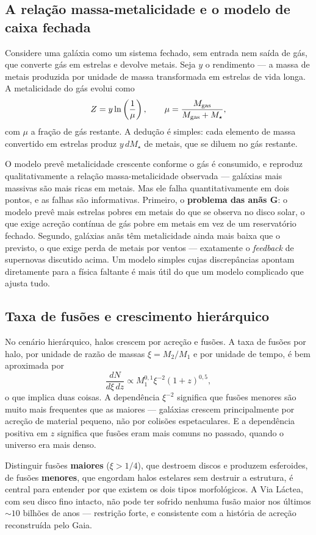 \documentclass[11pt,a4paper]{article}
\begin{document}
\subsection*{A relação massa-metalicidade e o modelo de caixa fechada}

Considere uma galáxia como um sistema fechado, sem entrada nem saída de gás, que converte gás em estrelas e devolve metais. Seja $y$ o rendimento --- a massa de metais produzida por unidade de massa transformada em estrelas de vida longa. A metalicidade do gás evolui como
\[
Z=y\ln\left(\frac{1}{\mu}\right),
\qquad
\mu=\frac{M_{\rm gas}}{M_{\rm gas}+M_\star},
\]
com $\mu$ a fração de gás restante. A dedução é simples: cada elemento de massa convertido em estrelas produz $y\,dM_\star$ de metais, que se diluem no gás restante.

O modelo prevê metalicidade crescente conforme o gás é consumido, e reproduz qualitativamente a relação massa-metalicidade observada --- galáxias mais massivas são mais ricas em metais. Mas ele falha quantitativamente em dois pontos, e as falhas são informativas. Primeiro, o \textbf{problema das anãs G}: o modelo prevê mais estrelas pobres em metais do que se observa no disco solar, o que exige acreção contínua de gás pobre em metais em vez de um reservatório fechado. Segundo, galáxias anãs têm metalicidade ainda mais baixa que o previsto, o que exige perda de metais por ventos --- exatamente o \textit{feedback} de supernovas discutido acima. Um modelo simples cujas discrepâncias apontam diretamente para a física faltante é mais útil do que um modelo complicado que ajusta tudo.

\subsection*{Taxa de fusões e crescimento hierárquico}

No cenário hierárquico, halos crescem por acreção e fusões. A taxa de fusões por halo, por unidade de razão de massas $\xi=M_2/M_1$ e por unidade de tempo, é bem aproximada por
\[
\frac{dN}{d\xi\,dz}\propto M_1^{0{,}1}\xi^{-2}\left(1+z\right)^{0{,}5},
\]
o que implica duas coisas. A dependência $\xi^{-2}$ significa que fusões menores são muito mais frequentes que as maiores --- galáxias crescem principalmente por acreção de material pequeno, não por colisões espetaculares. E a dependência positiva em $z$ significa que fusões eram mais comuns no passado, quando o universo era mais denso.

Distinguir fusões \textbf{maiores} ($\xi>1/4$), que destroem discos e produzem esferoides, de fusões \textbf{menores}, que engordam halos estelares sem destruir a estrutura, é central para entender por que existem os dois tipos morfológicos. A Via Láctea, com seu disco fino intacto, não pode ter sofrido nenhuma fusão maior nos últimos $\sim10$ bilhões de anos --- restrição forte, e consistente com a história de acreção reconstruída pelo Gaia.
\end{document}
